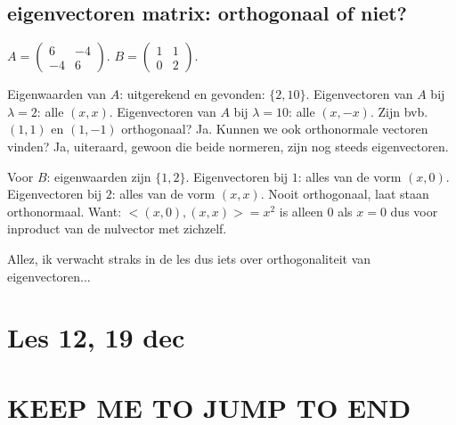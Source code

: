 \documentclass{article}
\begin{document}
\subsection{eigenvectoren matrix: orthogonaal of niet?}

$A = \begin{pmatrix} 6 & -4 \\ -4 & 6 \end{pmatrix}$. $B = \begin{pmatrix} 1 & 1 \\ 0 & 2 \end{pmatrix}$. 

Eigenwaarden van $A$: uitgerekend en gevonden: $\{ 2, 10 \}$. 
Eigenvectoren van $A$ bij $\lambda=2$: alle $(x,x)$. Eigenvectoren van $A$ bij $\lambda=10$: alle $(x,-x)$. 
Zijn bvb. $(1,1)$ en $(1,-1)$ orthogonaal? Ja. Kunnen we ook orthonormale vectoren vinden? Ja, uiteraard, gewoon die beide normeren, zijn nog steeds eigenvectoren. 

Voor $B$: eigenwaarden zijn $\{ 1,2 \}$. Eigenvectoren bij $1$: alles van de vorm $(x,0)$. 
Eigenvectoren bij $2$: alles van de vorm $(x,x)$. Nooit orthogonaal, laat staan orthonormaal. 
Want: $<(x,0), (x,x)> = x^2$ is alleen $0$ als $x=0$ dus voor inproduct van de nulvector met zichzelf. 

Allez, ik verwacht straks in de les dus iets over orthogonaliteit van eigenvectoren... 

\section{Les 12, 19 dec}

\section*{KEEP ME TO JUMP TO END}
\end{document}
